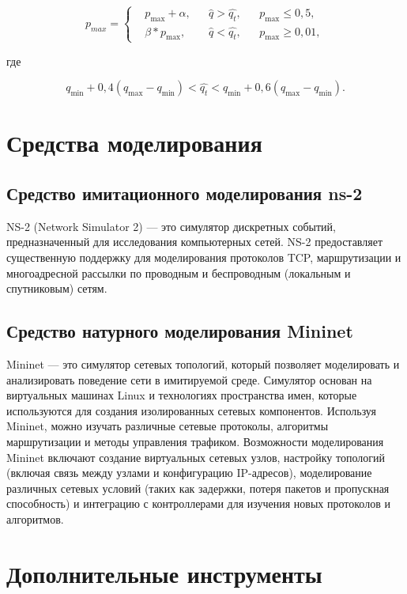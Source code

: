 \[
p_{max} = \left\{
  \begin{aligned}
   & p_{\max}+\alpha, && \hat{q}>\hat{q_{t}}, && p_{\max} \leqslant 0,5, \\
   & \beta * p_{\max}, && \hat{q}<\hat{q_{t}}, && p_{\max} \geqslant 0,01, 
  \end{aligned}
\right.
\]

где

\[
q_{\min}+0,4\left(q_{\max}-q_{\min}\right) < \hat{q_t} < q_{\min}+0,6\left(q_{\max}-q_{\min}\right).
\]

\section{Средства моделирования}
\label{chap1:sec3}

\subsection{Средство имитационного моделирования ns-2}
\label{chap1:sec3:sub1}

NS-2 (Network Simulator 2) --- это симулятор дискретных событий,
предназначенный для исследования компьютерных сетей. NS-2 предоставляет
существенную поддержку для моделирования протоколов TCP, маршрутизации и
многоадресной рассылки по проводным и беспроводным (локальным и спутниковым)
сетям.

\subsection{Средство натурного моделирования Mininet}
\label{chap1:sec3:sub2}

Mininet --- это симулятор сетевых топологий, который позволяет моделировать и
анализировать поведение сети в имитируемой среде. Симулятор основан на
виртуальных машинах Linux и технологиях пространства имен, которые используются
для создания изолированных сетевых компонентов. Используя Mininet, можно
изучать различные сетевые протоколы, алгоритмы маршрутизации и методы
управления трафиком. Возможности моделирования Mininet включают создание
виртуальных сетевых узлов, настройку топологий (включая связь между узлами и
конфигурацию IP-адресов), моделирование различных сетевых условий (таких как
задержки, потеря пакетов и пропускная способность) и интеграцию с контроллерами
для изучения новых протоколов и алгоритмов.

\section{Дополнительные инструменты} %
\label{chap1:sec4}

